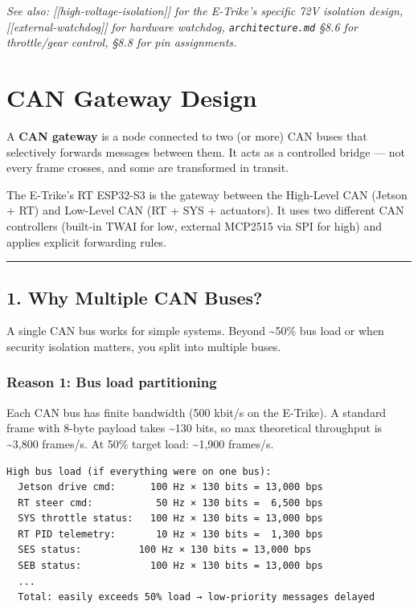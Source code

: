 \documentclass[12pt,a4paper,oneside]{report}
\begin{document}
\emph{See also: {[}{[}high-voltage-isolation{]}{]} for the E-Trike's specific
72V isolation design, {[}{[}external-watchdog{]}{]} for hardware watchdog,
\texttt{architecture.md} §8.6 for throttle/gear control, §8.8 for pin
assignments.}


\chapter{CAN Gateway Design}\label{can-gateway-design}

A \textbf{CAN gateway} is a node connected to two (or more) CAN buses that
selectively forwards messages between them. It acts as a controlled bridge ---
not every frame crosses, and some are transformed in transit.

The E-Trike's RT ESP32-S3 is the gateway between the High-Level CAN (Jetson +
RT) and Low-Level CAN (RT + SYS + actuators). It uses two different CAN
controllers (built-in TWAI for low, external MCP2515 via SPI for high) and
applies explicit forwarding rules.

\begin{center}\rule{0.5\linewidth}{0.5pt}\end{center}

\section{1. Why Multiple CAN Buses?}\label{why-multiple-can-buses}

A single CAN bus works for simple systems. Beyond \textasciitilde50\% bus load
or when security isolation matters, you split into multiple buses.

\subsection{Reason 1: Bus load
partitioning}\label{reason-1-bus-load-partitioning}

Each CAN bus has finite bandwidth (500 kbit/s on the E-Trike). A standard frame
with 8-byte payload takes \textasciitilde130 bits, so max theoretical throughput
is \textasciitilde3,800 frames/s. At 50\% target load: \textasciitilde1,900
frames/s.

\begin{verbatim}
High bus load (if everything were on one bus):
  Jetson drive cmd:      100 Hz × 130 bits = 13,000 bps
  RT steer cmd:           50 Hz × 130 bits =  6,500 bps
  SYS throttle status:   100 Hz × 130 bits = 13,000 bps
  RT PID telemetry:       10 Hz × 130 bits =  1,300 bps
  SES status:          100 Hz × 130 bits = 13,000 bps
  SEB status:            100 Hz × 130 bits = 13,000 bps
  ...
  Total: easily exceeds 50% load → low-priority messages delayed
\end{verbatim}
\end{document}
